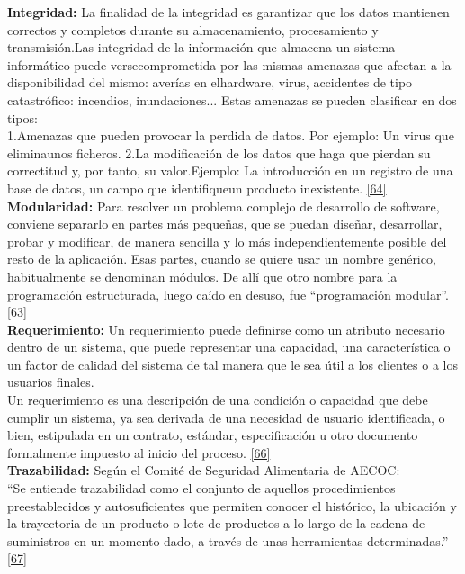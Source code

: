 \textbf {Integridad:} 
La finalidad de la integridad es garantizar que los datos mantienen correctos y completos durante su almacenamiento, procesamiento y transmisión.Las   integridad   de   la   información   que   almacena   un   sistema   informático   puede   versecomprometida por las mismas amenazas que afectan a la disponibilidad del mismo: averías en elhardware, virus, accidentes de tipo catastrófico: incendios, inundaciones... Estas amenazas se pueden clasificar en dos tipos:\\
1.Amenazas que pueden provocar la perdida de datos. Por ejemplo: Un virus que eliminaunos ficheros.
2.La modificación de los datos que haga que pierdan su correctitud y, por tanto, su valor.Ejemplo: La introducción en un registro de una base de datos,  un campo que identifiqueun producto inexistente. \hyperlink{b64}{[64]}\\

\textbf {Modularidad:} Para resolver un problema complejo de desarrollo de software, conviene separarlo en partes más pequeñas, que se puedan diseñar, desarrollar, probar y modificar, de manera sencilla y lo más independientemente posible del resto de la aplicación.
Esas partes, cuando se quiere usar un nombre genérico, habitualmente se denominan módulos. De allí que otro nombre para la programación estructurada, luego caído en desuso, fue “programación modular”. \hyperlink{b63}{[63]}\\

\textbf {Requerimiento:} Un requerimiento puede definirse como un atributo necesario dentro de un sistema, que puede representar una capacidad, una característica o un factor de calidad del sistema de tal manera que le sea útil a los clientes o a los usuarios finales.\\

Un requerimiento es una descripción de una condición o capacidad que debe cumplir un sistema, ya sea derivada de una necesidad de usuario identificada, o bien, estipulada en un contrato, estándar, especificación u otro documento formalmente impuesto al inicio del proceso. \hyperlink{b66}{[66]}\\

\textbf {Trazabilidad:} Según el Comité de Seguridad Alimentaria de AECOC:\\

“Se entiende trazabilidad como el conjunto de aquellos procedimientos preestablecidos y autosuficientes que permiten conocer el histórico, la ubicación y la trayectoria de un producto o lote de productos a lo largo de la cadena de suministros en un momento dado, a través de unas herramientas determinadas.” \hyperlink{b67}{[67]}\\


